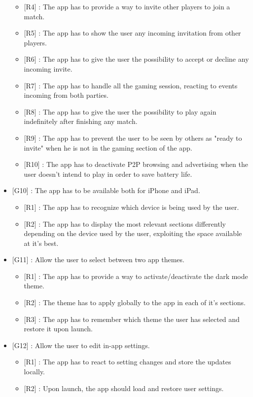 \documentclass[paper=a4, fontsize=12pt]{scrartcl}
\numberwithin{equation}{section}		%
\numberwithin{figure}{section}			%
\numberwithin{table}{section}				%
\begin{document}
\begin{itemize}
\begin{itemize}
\item {[R4]} : The app has to provide a way to invite other players to join a match.
\item {[R5]} : The app has to show the user any incoming invitation from other players.
\item {[R6]} : The app has to give the user the possibility to accept or decline any incoming invite.
\item {[R7]} : The app has to handle all the gaming session, reacting to events incoming from both parties.
\item {[R8]} : The app has to give the user the possibility to play again indefinitely after finishing any match.
\item {[R9]} : The app has to prevent the user to be seen by others as "ready to invite" when he is not in the gaming section of the app.
\item {[R10]} : The app has to deactivate P2P browsing and advertising when the user doesn't intend to play in order to save battery life.
\end{itemize}
\item {[G10]} : The app has to be available both for iPhone and iPad.
\begin{itemize}
\item {[R1]} : The app has to recognize which device is being used by the user.
\item {[R2]} : The app has to display the most relevant sections differently depending on the device used by the user, exploiting the space available at it's best.
\end{itemize}
\item {[G11]} : Allow the user to select between two app themes.
\begin{itemize}
\item {[R1]} : The app has to provide a way to activate/deactivate the dark mode theme.
\item {[R2]} : The theme has to apply globally to the app in each of it's sections. 
\item {[R3]} : The app has to remember which theme the user has selected and restore it upon launch.
\end{itemize}
\item {[G12]} : Allow the user to edit in-app settings.
\begin{itemize}
\item {[R1]} : The app has to react to setting changes and store the updates locally.
\item {[R2]} : Upon launch, the app should load and restore user settings. 
\end{itemize}
\end{itemize}
\end{document}
